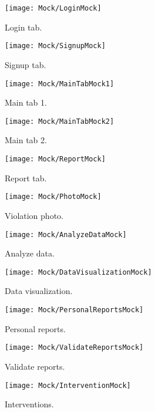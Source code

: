 \begin{figure}[htbp]
	\centering
	\begin{minipage}[b]{.4\linewidth}	    \texttt{[image: Mock/LoginMock]}
	    \caption{Login tab.}
	\end{minipage}
	\begin{minipage}[b]{0.4\linewidth}
	    \texttt{[image: Mock/SignupMock]}
	    \caption{Signup tab.}
	\end{minipage}
\end{figure}

\begin{figure}[htbp]
	\centering
	\begin{minipage}[b]{0.4\linewidth}
	    \texttt{[image: Mock/MainTabMock1]}
	    \caption{Main tab 1.}
	\end{minipage}
	\begin{minipage}[b]{0.4\linewidth}
	    \texttt{[image: Mock/MainTabMock2]}
	    \caption{Main tab 2.}
	\end{minipage}
	\begin{minipage}[b]{0.4\linewidth}
	    \texttt{[image: Mock/ReportMock]}
	    \caption{Report tab.}
	\end{minipage}
	\begin{minipage}[b]{0.4\linewidth}
	    \texttt{[image: Mock/PhotoMock]}
	    \caption{Violation photo.}
	\end{minipage}
\end{figure}

\begin{figure}[htbp]
	\centering
	\begin{minipage}[b]{0.4\linewidth}
	    \texttt{[image: Mock/AnalyzeDataMock]}
	    \caption{Analyze data.}
	\end{minipage}
	\begin{minipage}[b]{0.4\linewidth}
	    \texttt{[image: Mock/DataVisualizationMock]}
	    \caption{Data visualization.}
	\end{minipage}
	\begin{minipage}[b]{0.4\linewidth}
	    \texttt{[image: Mock/PersonalReportsMock]}
	    \caption{Personal reports.}
	\end{minipage}
	\begin{minipage}[b]{0.4\linewidth}
	    \texttt{[image: Mock/ValidateReportsMock]}
	    \caption{Validate reports.}
	\end{minipage}
	
\end{figure}

\begin{figure}[htbp]
	\centering
	\begin{minipage}[b]{0.4\linewidth}
	    \texttt{[image: Mock/InterventionMock]}
	    \caption{Interventions.}
	\end{minipage}
	
\end{figure}





